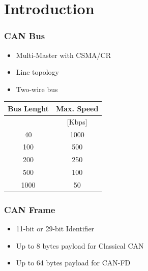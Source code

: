 \documentclass[aspectratio=169]{beamer}
\begin{document}
\section{Introduction}
\begin{frame}
	\frametitle{CAN Bus}
	\begin{minipage}[t]{0.5\textwidth}
		\begin{itemize}
			\item Multi-Master with CSMA/CR
			\item Line topology
			\item Two-wire bus
		\end{itemize}
	\end{minipage}
	\begin{minipage}[t]{0.4\textwidth}
		\begin{table}
			\centering
			\tiny
			\begin{tabular}{|c|c|} 
				\hline
				Bus Lenght & Max. Speed \\ \hline
				[m]    & [Kbps]     \\
				\hline
				\hline
				40     & 1000       \\ \hline
				100    & 500        \\ \hline
				200    & 250        \\ \hline
				500    & 100        \\ \hline
				1000   & 50         \\ \hline
			\end{tabular}
			\label{tab:bus_speed}	
		\end{table}
	\end{minipage}
	\begin{minipage}[t]{0.05\textwidth}
		\tiny\cite{TiCANPhy}
	\end{minipage}

	\vspace{1em}
	
\end{frame}

\begin{frame}
	\frametitle{CAN Frame}
	\begin{minipage}[t]{0.8\textwidth}
		\begin{itemize}
			\item 11-bit or 29-bit Identifier
			\item Up to 8 bytes payload for Classical CAN
			\item Up to 64 bytes payload for CAN-FD
		\end{itemize}
	\end{minipage}
	\begin{minipage}[t]{0.1\textwidth}
		{\tiny\cite{BoschCAN} \cite{BoschCANFD}}
	\end{minipage}

	\vspace{1.5em}
	
\end{frame}
\end{document}
